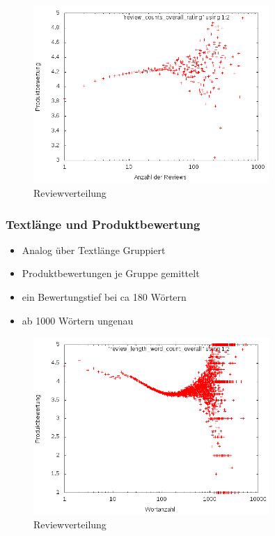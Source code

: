 \documentclass{beamer}
\begin{document}
		\begin{frame}
	\begin{figure}[H]
\centering
    \includegraphics[width=0.8\textwidth]{_results/rating_count.png}
    \caption{Reviewverteilung}
\end{figure}
	\end{frame}
	
	\begin{frame}
	\frametitle{Textlänge und Produktbewertung}
	\begin{itemize}
	\item Analog über Textlänge Gruppiert
	\item Produktbewertungen je Gruppe gemittelt
	\item ein Bewertungstief bei ca 180 Wörtern
	\item ab 1000 Wörtern ungenau
	\end{itemize}
	\end{frame}
		
	\begin{frame}
		\begin{figure}[H]
    \includegraphics[width=0.8\textwidth]{_results/word_rating.png}
    \caption{Reviewverteilung}
	\end{figure}
	\end{frame}
	
\end{document}
